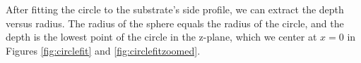 After fitting the circle to the substrate's side profile, we can extract the depth versus radius. The radius of the sphere equals the radius of the circle, and the depth is the lowest point of the circle in the z-plane, which we center at $ x=0 $ in Figures \ref{fig:circlefit} and \ref{fig:circlefitzoomed}.  
